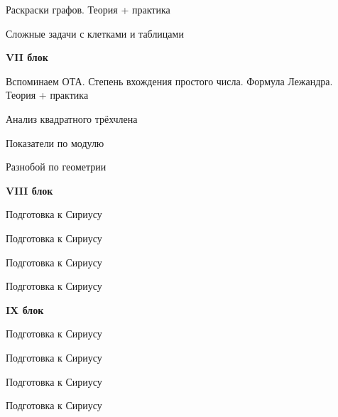 Раскраски графов. Теория + практика

Сложные задачи с клетками и таблицами

\textbf{\Large VII блок}

Вспоминаем ОТА. Степень вхождения простого числа. Формула Лежандра. Теория + практика

Анализ квадратного трёхчлена

Показатели по модулю

Разнобой по геометрии


\textbf{\Large VIII блок}

Подготовка к Сириусу

Подготовка к Сириусу

Подготовка к Сириусу

Подготовка к Сириусу

\textbf{\Large IX блок}

Подготовка к Сириусу

Подготовка к Сириусу

Подготовка к Сириусу

Подготовка к Сириусу
